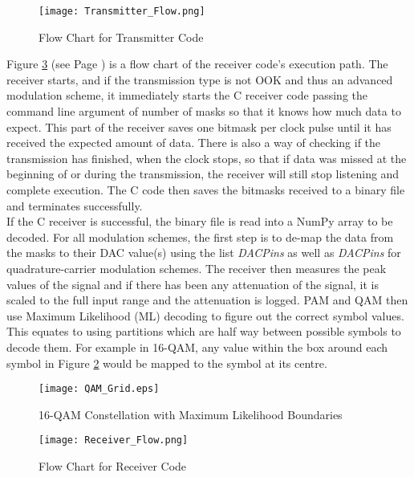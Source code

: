 \documentclass[../main.tex]{subfiles}
\begin{document}
\begin{figure}[ht]
	\centering
	\texttt{[image: Transmitter\_Flow.png]}
	\caption{Flow Chart for Transmitter Code}
	\label{fig_Transmitter_Flow}
\end{figure}


\clearpage

Figure \ref{fig_Receiver_Flow} (see Page \pageref{fig_Receiver_Flow}) is a flow chart of the receiver code's execution path.
The receiver starts, and if the transmission type is not OOK and thus an advanced modulation scheme, it immediately starts the C receiver code passing the command line argument of number of masks so that it knows how much data to expect.
This part of the receiver saves one bitmask per clock pulse until it has received the expected amount of data.
There is also a way of checking if the transmission has finished, when the clock stops, so that if data was missed at the beginning of or during the transmission, the receiver will still stop listening and complete execution.
The C code then saves the bitmasks received to a binary file and terminates successfully.\\

If the C receiver is successful, the binary file is read into a NumPy array to be decoded.
For all modulation schemes, the first step is to de-map the data from the masks to their DAC value(s) using the list \textit{DAC\textunderscore Pins} as well as \textit{DAC\textunderscore Pins} for quadrature-carrier modulation schemes.
The receiver then measures the peak values of the signal and if there has been any attenuation of the signal, it is scaled to the full input range and the attenuation is logged.
PAM and QAM then use Maximum Likelihood (ML) decoding to figure out the correct symbol values.
This equates to using partitions which are half way between possible symbols to decode them.
For example in 16-QAM, any value within the box around each symbol in Figure \ref{fig_QAM ML Decoding} would be mapped to the symbol at its centre.\\

\begin{figure}[ht]
	\centering
	\texttt{[image: QAM\_Grid.eps]}
	\caption{16-QAM Constellation with Maximum Likelihood Boundaries}
	\label{fig_QAM ML Decoding}
\end{figure}

\begin{figure}[ht]
	\centering
	\texttt{[image: Receiver\_Flow.png]}
	\caption{Flow Chart for Receiver Code}
	\label{fig_Receiver_Flow}
\end{figure}
\end{document}
